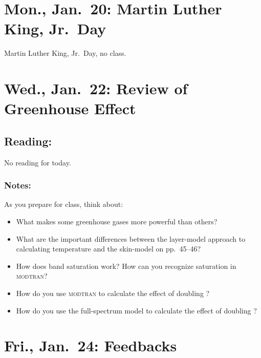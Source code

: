 \documentclass[
]{article}
\providecommand{\tightlist}{%
  \setlength{\itemsep}{0pt}\setlength{\parskip}{0pt}}
\newcommand{\COO}{\ce{CO2}}
\newcommand{\MODTRAN}{\textsc{modtran}}
\begin{document}
\hypertarget{mon.-jan.-20-martin-luther-king-jr.-day}{%
\section{Mon., Jan.~20: Martin Luther King,
Jr.~Day}\label{mon.-jan.-20-martin-luther-king-jr.-day}}

Martin Luther King, Jr.~Day, no class.

\hypertarget{wed.-jan.-22-review-of-greenhouse-effect}{%
\section{Wed., Jan.~22: Review of Greenhouse
Effect}\label{wed.-jan.-22-review-of-greenhouse-effect}}

\hypertarget{reading-6}{%
\subsection{Reading:}\label{reading-6}}

No reading for today.

\hypertarget{notes}{%
\subsubsection{Notes:}\label{notes}}

As you prepare for class, think about:

\begin{itemize}
\tightlist
\item
  What makes some greenhouse gases more powerful than others?
\item
  What are the important differences between the layer-model approach to
  calculating temperature and the skin-model on pp.~45--46?
\item
  How does band saturation work? How can you recognize saturation in
  \MODTRAN{}?
\item
  How do you use \MODTRAN{} to calculate the effect of doubling \COO{}?
\item
  How do you use the full-spectrum model to calculate the effect of
  doubling \COO{}?
\end{itemize}

\hypertarget{fri.-jan.-24-feedbacks}{%
\section{Fri., Jan.~24: Feedbacks}\label{fri.-jan.-24-feedbacks}}
\end{document}
